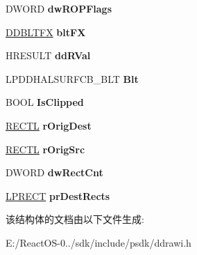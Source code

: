 \begin{DoxyCompactItemize}
D\+W\+O\+RD {\bfseries dw\+R\+O\+P\+Flags}
\item 
\mbox{\label{struct___d_d_h_a_l___b_l_t_d_a_t_a_a2c2ee1707ecdada3ecff99d1f385ab40}} 
\hyperlink{struct___d_d_b_l_t_f_x}{D\+D\+B\+L\+T\+FX} {\bfseries blt\+FX}
\item 
\mbox{\label{struct___d_d_h_a_l___b_l_t_d_a_t_a_a3b2e600729954e32fec0da60779e7a07}} 
H\+R\+E\+S\+U\+LT {\bfseries dd\+R\+Val}
\item 
\mbox{\label{struct___d_d_h_a_l___b_l_t_d_a_t_a_ac8c4b4ec5c6de1e39512afccef0ce12e}} 
L\+P\+D\+D\+H\+A\+L\+S\+U\+R\+F\+C\+B\+\_\+\+B\+LT {\bfseries Blt}
\item 
\mbox{\label{struct___d_d_h_a_l___b_l_t_d_a_t_a_a9af504dd08410d8be221b64be2deabbd}} 
B\+O\+OL {\bfseries Is\+Clipped}
\item 
\mbox{\label{struct___d_d_h_a_l___b_l_t_d_a_t_a_a86b2ed7fc08b6f6a7906602f0c4f04f1}} 
\hyperlink{struct___r_e_c_t_l}{R\+E\+C\+TL} {\bfseries r\+Orig\+Dest}
\item 
\mbox{\label{struct___d_d_h_a_l___b_l_t_d_a_t_a_af017f4d0a1ef51a0d6cffabc6b447ad2}} 
\hyperlink{struct___r_e_c_t_l}{R\+E\+C\+TL} {\bfseries r\+Orig\+Src}
\item 
\mbox{\label{struct___d_d_h_a_l___b_l_t_d_a_t_a_a0ed477c02897e2aa571371c653898932}} 
D\+W\+O\+RD {\bfseries dw\+Rect\+Cnt}
\item 
\mbox{\label{struct___d_d_h_a_l___b_l_t_d_a_t_a_ae1e696d24c61ae3aab8577a933018171}} 
\hyperlink{structtag_r_e_c_t}{L\+P\+R\+E\+CT} {\bfseries pr\+Dest\+Rects}
\end{DoxyCompactItemize}


该结构体的文档由以下文件生成\+:\begin{DoxyCompactItemize}
\item 
E\+:/\+React\+O\+S-\/0../sdk/include/psdk/ddrawi.\+h\end{DoxyCompactItemize}
